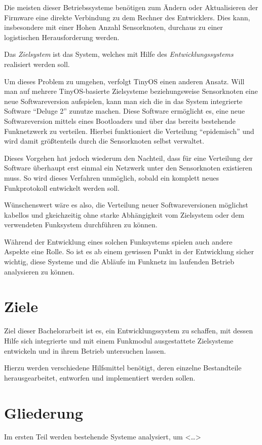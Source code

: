 Die meisten dieser Betriebssysteme benötigen zum Ändern oder
Aktualisieren der Firmware eine direkte Verbindung zu dem Rechner des
Entwicklers. Dies kann, insbesondere mit einer Hohen Anzahl Sensorknoten,
durchaus zu einer logistischen Herausforderung werden.

\begin{definition}[Zielsystem]
Das \emph{Zielsystem} ist das System, welches mit Hilfe des
\emph{Entwicklungssystems} realisiert werden soll.
\end{definition}

Um dieses Problem zu umgehen, verfolgt TinyOS einen anderen Ansatz. Will man auf
mehrere TinyOS-basierte Zielsysteme beziehungsweise Sensorknoten eine neue
Softwareversion aufspielen, kann man sich die in das System integrierte Software
"`Deluge 2"'\cite{DELUG} zunutze machen. Diese Software ermöglicht es, eine neue
Softwareversion mittels eines Bootloaders und über das bereits bestehende
Funknetzwerk zu verteilen. Hierbei funktioniert die Verteilung "`epidemisch"'
und wird damit größtenteils durch die Sensorknoten selbst verwaltet.

Dieses Vorgehen hat jedoch wiederum den Nachteil, dass für eine Verteilung der
Software überhaupt erst einmal ein Netzwerk unter den Sensorknoten existieren
muss. So wird dieses Verfahren unmöglich, sobald ein komplett neues
Funkprotokoll entwickelt werden soll.

Wünschenswert wäre es also, die Verteilung neuer Softwareversionen möglichst
kabellos und gkeichzeitig ohne starke Abhängigkeit vom Zielsystem oder dem
verwendeten Funksystem durchführen zu können.

Während der Entwicklung eines solchen Funksystems spielen auch andere
Aspekte eine Rolle. So ist es ab einem gewissen Punkt in der Entwicklung sicher
wichtig, diese Systeme und die Abläufe im Funknetz im laufenden Betrieb
analysieren zu können.

\section{Ziele}
Ziel dieser Bachelorarbeit ist es, ein Entwicklungssystem zu schaffen,
mit dessen Hilfe sich integrierte und mit einem Funkmodul ausgestattete
Zielsysteme entwickeln und in ihrem Betrieb untersuchen lassen.

Hierzu werden verschiedene Hilfsmittel benötigt, deren einzelne Bestandteile
herausgearbeitet, entworfen und implementiert werden sollen.
\section{Gliederung}
Im ersten Teil werden bestehende Systeme analysiert, um <\ldots>
